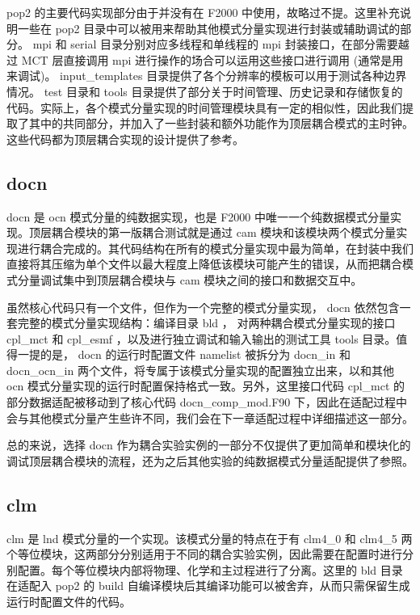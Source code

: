pop2 的主要代码实现部分由于并没有在 F2000 中使用，故略过不提。这里补充说明一些在 pop2 目录中可以被用来帮助其他模式分量实现进行封装或辅助调试的部分。 mpi 和 serial 目录分别对应多线程和单线程的 mpi 封装接口，在部分需要越过 MCT 层直接调用 mpi 进行操作的场合可以运用这些接口进行调用 (通常是用来调试)。 input\_templates 目录提供了各个分辨率的模板可以用于测试各种边界情况。 test 目录和 tools 目录提供了部分关于时间管理、历史记录和存储恢复的代码。实际上，各个模式分量实现的时间管理模块具有一定的相似性，因此我们提取了其中的共同部分，并加入了一些封装和额外功能作为顶层耦合模式的主时钟。这些代码都为顶层耦合实现的设计提供了参考。

\subsection{docn}

docn 是 ocn 模式分量的纯数据实现，也是 F2000 中唯一一个纯数据模式分量实现。顶层耦合模块的第一版耦合测试就是通过 cam 模块和该模块两个模式分量实现进行耦合完成的。其代码结构在所有的模式分量实现中最为简单，在封装中我们直接将其压缩为单个文件以最大程度上降低该模块可能产生的错误，从而把耦合模式分量调试集中到顶层耦合模块与 cam 模块之间的接口和数据交互中。

虽然核心代码只有一个文件，但作为一个完整的模式分量实现， docn 依然包含一套完整的模式分量实现结构：编译目录 bld ， 对两种耦合模式分量实现的接口 cpl\_mct 和 cpl\_esmf ，以及进行独立调试和输入输出的测试工具 tools 目录。值得一提的是， docn 的运行时配置文件 namelist 被拆分为 docn\_in 和 docn\_ocn\_in 两个文件，将专属于该模式分量实现的配置独立出来，以和其他 ocn 模式分量实现的运行时配置保持格式一致。另外，这里接口代码 cpl\_mct 的部分数据适配被移动到了核心代码 docn\_comp\_mod.F90 下，因此在适配过程中会与其他模式分量产生些许不同，我们会在下一章适配过程中详细描述这一部分。

总的来说，选择 docn 作为耦合实验实例的一部分不仅提供了更加简单和模块化的调试顶层耦合模块的流程，还为之后其他实验的纯数据模式分量适配提供了参照。

\subsection{clm}

clm 是 lnd 模式分量的一个实现。该模式分量的特点在于有 clm4\_0 和 clm4\_5 两个等位模块，这两部分分别适用于不同的耦合实验实例，因此需要在配置时进行分别配置。每个等位模块内部将物理、化学和主过程进行了分离。这里的 bld 目录在适配入 pop2 的 build 自编译模块后其编译功能可以被舍弃，从而只需保留生成运行时配置文件的代码。

